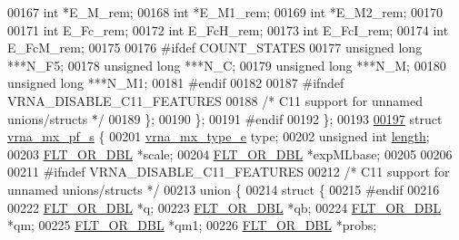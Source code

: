 \begin{DoxyCode}
00167       \textcolor{keywordtype}{int}             *E\_M\_rem;
00168       \textcolor{keywordtype}{int}             *E\_M1\_rem;
00169       \textcolor{keywordtype}{int}             *E\_M2\_rem;
00170 
00171       \textcolor{keywordtype}{int}             E\_Fc\_rem;
00172       \textcolor{keywordtype}{int}             E\_FcH\_rem;
00173       \textcolor{keywordtype}{int}             E\_FcI\_rem;
00174       \textcolor{keywordtype}{int}             E\_FcM\_rem;
00175 
00176 \textcolor{preprocessor}{#ifdef COUNT\_STATES}
00177       \textcolor{keywordtype}{unsigned} \textcolor{keywordtype}{long}   ***N\_F5;
00178       \textcolor{keywordtype}{unsigned} \textcolor{keywordtype}{long}   ***N\_C;
00179       \textcolor{keywordtype}{unsigned} \textcolor{keywordtype}{long}   ***N\_M;
00180       \textcolor{keywordtype}{unsigned} \textcolor{keywordtype}{long}   ***N\_M1;
00181 \textcolor{preprocessor}{#endif}
00182 
00187 \textcolor{preprocessor}{#ifndef VRNA\_DISABLE\_C11\_FEATURES}
00188     \textcolor{comment}{/* C11 support for unnamed unions/structs */}
00189     \};
00190   \};
00191 \textcolor{preprocessor}{#endif}
00192 \};
00193 
\hypertarget{dp__matrices_8h_source.tex_l00197}{}\hyperlink{group__dp__matrices}{00197} \textcolor{keyword}{struct }\hyperlink{group__dp__matrices_structvrna__mx__pf__s}{vrna\_mx\_pf\_s} \{
00201   \hyperlink{group__dp__matrices_ga6042ea1d58d01931e959791be6d89343}{vrna\_mx\_type\_e}  type;
00202   \textcolor{keywordtype}{unsigned} \textcolor{keywordtype}{int}    \hyperlink{group__dp__matrices_a1f92a8406fc1fb721dbf9193c34ad826}{length};
00203   \hyperlink{group__data__structures_ga31125aeace516926bf7f251f759b6126}{FLT\_OR\_DBL}      *scale;
00204   \hyperlink{group__data__structures_ga31125aeace516926bf7f251f759b6126}{FLT\_OR\_DBL}      *expMLbase;
00205 
00206 
00211 \textcolor{preprocessor}{#ifndef VRNA\_DISABLE\_C11\_FEATURES}
00212     \textcolor{comment}{/* C11 support for unnamed unions/structs */}
00213   \textcolor{keyword}{union }\{
00214     \textcolor{keyword}{struct }\{
00215 \textcolor{preprocessor}{#endif}
00216 
00222       \hyperlink{group__data__structures_ga31125aeace516926bf7f251f759b6126}{FLT\_OR\_DBL}  *q;
00223       \hyperlink{group__data__structures_ga31125aeace516926bf7f251f759b6126}{FLT\_OR\_DBL}  *qb;
00224       \hyperlink{group__data__structures_ga31125aeace516926bf7f251f759b6126}{FLT\_OR\_DBL}  *qm;
00225       \hyperlink{group__data__structures_ga31125aeace516926bf7f251f759b6126}{FLT\_OR\_DBL}  *qm1;
00226       \hyperlink{group__data__structures_ga31125aeace516926bf7f251f759b6126}{FLT\_OR\_DBL}  *probs;

\end{DoxyCode}
